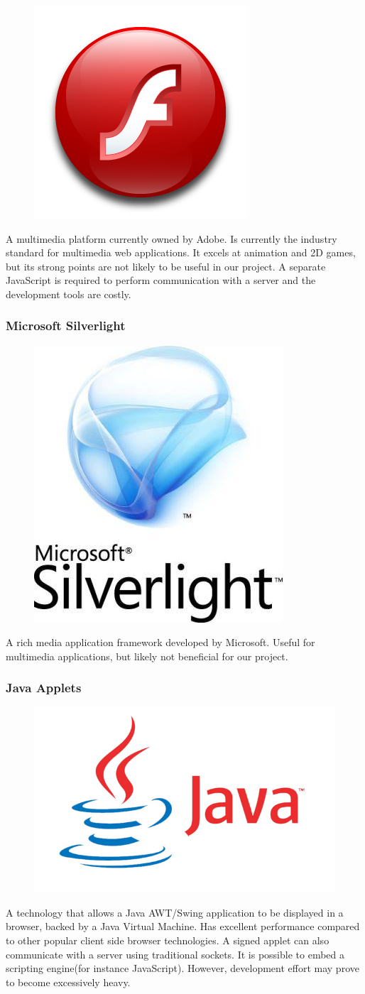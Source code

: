 \begin{figure}
\vspace{-30pt}
\centering
\includegraphics[width = .10\textwidth]{image/flash-logo.png}
\end{figure}


A multimedia platform currently owned by Adobe. Is currently the industry standard for multimedia web applications. It excels at animation and 2D games, but its strong points are not likely to be useful in our project. A separate JavaScript is required to perform communication with a server and the development tools are costly.

\subsubsection{Microsoft Silverlight}

\begin{figure}
\vspace{-47pt}
\centering
\includegraphics[width=.10\textwidth]{image/silverlight-logo.jpg}
\end{figure}

A rich media application framework developed by Microsoft. Useful for multimedia applications, but likely not beneficial for our project.

\subsubsection{Java Applets}

\begin{figure}
\vspace{-30pt}
\centering
\includegraphics[width=.14\textwidth]{image/java-logo.jpg}
\end{figure}

A technology that allows a Java AWT/Swing application to be displayed in a browser, backed by a Java Virtual Machine. Has excellent performance compared to other popular client side browser technologies. A signed applet can also communicate with a server using traditional sockets. It is possible to embed a scripting engine(for instance JavaScript). However, development effort may prove to become excessively heavy.

